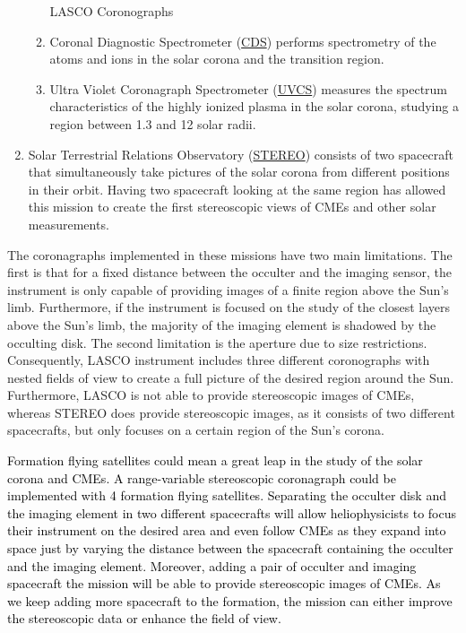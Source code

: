 \begin{enumerate}
\begin{enumerate}
\begin{table}[H]
\caption{LASCO Coronographs \cite{LASCO_Coronal_Imaging_Spectroscopy}}


\end{table}


\item Coronal Diagnostic Spectrometer (\href{http://solar.bnsc.rl.ac.uk/}{CDS})
performs spectrometry of the atoms and ions in the solar corona and
the transition region.
\item Ultra Violet Coronagraph Spectrometer (\href{http://www.cfa.harvard.edu/uvcs/}{UVCS})
measures the spectrum characteristics of the highly ionized plasma
in the solar corona, studying a region between 1.3 and 12 solar radii.
\end{enumerate}
\item Solar Terrestrial Relations Observatory (\href{http://www.nasa.gov/mission_pages/stereo/main/index.html\#.UjUnXsYagWA}{STEREO})
consists of two spacecraft that simultaneously take pictures of the
solar corona from different positions in their orbit. Having two spacecraft
looking at the same region has allowed this mission to create the
first stereoscopic views of CMEs and other solar measurements. 
\end{enumerate}
The coronagraphs implemented in these missions have two main limitations.
The first is that for a fixed distance between the occulter and the
imaging sensor, the instrument is only capable of providing images of
a finite region above the Sun's limb. Furthermore, if the instrument
is focused on the study of the closest layers above the Sun's limb,
the majority of the imaging element is shadowed by the occulting disk.
The second limitation is the aperture due to size restrictions. Consequently,
LASCO instrument includes three different coronographs with nested
fields of view to create a full picture of the desired region around
the Sun. Furthermore, LASCO is not able to provide stereoscopic images
of CMEs, whereas STEREO does provide stereoscopic images, as it consists
of two different spacecrafts, but only focuses on a certain region
of the Sun's corona.

\textcolor{black}{Formation flying satellites could mean a great leap
in the study of the solar corona and CMEs. A range-variable stereoscopic
coronagraph could be implemented with 4 formation flying satellites.
Separating the occulter disk and the imaging element in two different
spacecrafts will allow heliophysicists to focus their instrument on
the desired area and even follow CMEs as they expand into space just
by varying the distance between the spacecraft containing the occulter
and the imaging element. Moreover, adding a pair of occulter and imaging
spacecraft the mission will be able to provide stereoscopic images
of CMEs. As we keep adding more spacecraft to the formation, the mission
can either improve the stereoscopic data or enhance the field of view.}

